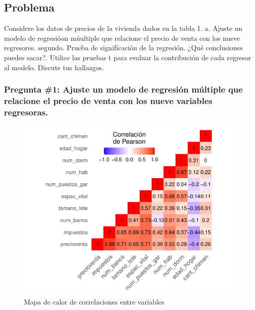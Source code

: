 \documentclass[
]{article}
\begin{document}
\hypertarget{problema}{%
\subsection{Problema}\label{problema}}

Considere los datos de precios de la vivienda dados en la tabla 1. a.
Ajuste un modelo de regresióon múultiple que relacione el precio de
venta con los nueve regresores. segundo. Prueba de signifícación de la
regresión. ¿Qué conclusiones puedes sacar?. Utilice las pruebas t para
evaluar la contribución de cada regresor al modelo. Discute tus
hallazgos.

\hypertarget{pregunta-1-ajuste-un-modelo-de-regresiuxf3n-muxfaltiple-que-relacione-el-precio-de-venta-con-los-nueve-variables-regresoras.}{%
\subsubsection{Pregunta \#1: Ajuste un modelo de regresión múltiple que
relacione el precio de venta con los nueve variables
regresoras.}\label{pregunta-1-ajuste-un-modelo-de-regresiuxf3n-muxfaltiple-que-relacione-el-precio-de-venta-con-los-nueve-variables-regresoras.}}

\begin{figure}
\centering
\includegraphics{diagnosticorrpp_files/figure-latex/heat map de correlaciones con ggcorrplot-1.pdf}
\caption{Mapa de calor de correlaciones entre variables}
\end{figure}
\end{document}

